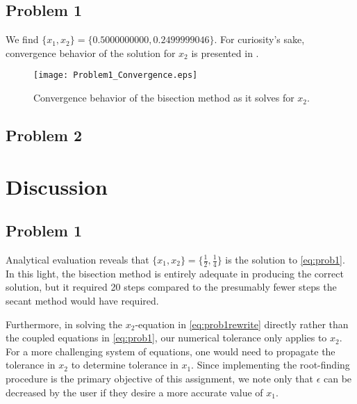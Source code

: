 \documentclass[12pt]{article}
\begin{document}
\subsection{Problem 1}

We find $\{ x_1, x_2 \} = \{ 0.5000000000, 0.2499999046 \}$. For curiosity's sake, convergence behavior of the solution for $x_2$ is presented in .

\begin{figure}[h!]
\begin{center}
\texttt{[image: Problem1\_Convergence.eps]}
\\
\caption{Convergence behavior of the bisection method as it solves for $x_2$.}
\label{fig:prob1_convergence}
\end{center}
\end{figure}

\subsection{Problem 2}

\section{Discussion} %

\subsection{Problem 1}

Analytical evaluation reveals that $\{ x_1, x_2 \} = \{ \tfrac{1}{2}, \tfrac{1}{4} \}$ is the solution to \eqref{eq:prob1}. In this light, the bisection method is entirely adequate in producing the correct solution, but it required 20 steps compared to the presumably fewer steps the secant method would have required.

Furthermore, in solving the $x_2$-equation in \eqref{eq:prob1rewrite} directly rather than the coupled equations in \eqref{eq:prob1}, our numerical tolerance only applies to $x_2$. For a more challenging system of equations, one would need to propagate the tolerance in $x_2$ to determine tolerance in $x_1$. Since implementing the root-finding procedure is the primary objective of this assignment, we note only that $\epsilon$ can be decreased by the user if they desire a more accurate value of $x_1$.
\end{document}
